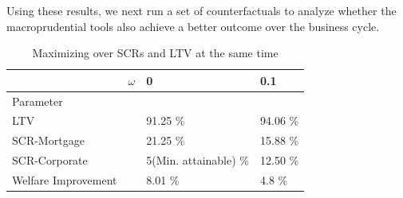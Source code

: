 \documentclass[12pt]{article}
\numberwithin{equation}{section}
\begin{document}
Using these results, we next run a set of counterfactuals to analyze whether the macroprudential tools also achieve a better outcome over the business cycle. 


\begin{table}[h]

\caption{Maximizing over SCRs and LTV at the same time}
\label{optimalPrud_2}
\begin{tabular}{l|l|l|l}

 & $\omega$ & 0 & 0.1   \\
 \hline
 \hline
Parameter & & &  \\
\hline
\hline
LTV &  & 91.25 \%   &  94.06 \%  \\

SCR-Mortgage &  & 21.25 \%     & 15.88 \%   \\

SCR-Corporate & &  5(Min. attainable) \%  & 12.50 \%  \\

Welfare Improvement & & 8.01 \% & 4.8 \% \\

\end{tabular}
\end{table}
\end{document}
